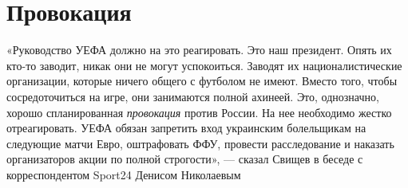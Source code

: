  
 
 
 
 
\chapter{Провокация}

«Руководство УЕФА должно на это реагировать. Это наш президент. Опять их кто-то
заводит, никак они не могут успокоиться. Заводят их националистические
организации, которые ничего общего с футболом не имеют. Вместо того, чтобы
сосредоточиться на игре, они занимаются полной ахинеей.  Это, однозначно,
хорошо спланированная \emph{провокация} против России. На нее необходимо жестко
отреагировать. УЕФА обязан запретить вход украинским болельщикам на следующие
матчи Евро, оштрафовать ФФУ, провести расследование и наказать организаторов
акции по полной строгости», — сказал Свищев в беседе с корреспондентом Sport24
Денисом Николаевым
